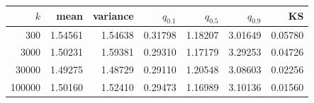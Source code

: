 \begin{tabular}{rrrrrrr}
\toprule
$k$ & mean & variance & $q_{0.1}$ & $q_{0.5}$ & $q_{0.9}$ & KS\\
\midrule
300 & 1.54561 & 1.54638 & 0.31798 & 1.18207 & 3.01649 & 0.05780\\
3000 & 1.50231 & 1.59381 & 0.29310 & 1.17179 & 3.29253 & 0.04726\\
30000 & 1.49275 & 1.48729 & 0.29110 & 1.20548 & 3.08603 & 0.02256\\
100000 & 1.50160 & 1.52410 & 0.29473 & 1.16989 & 3.10136 & 0.01560\\
\bottomrule
\end{tabular}